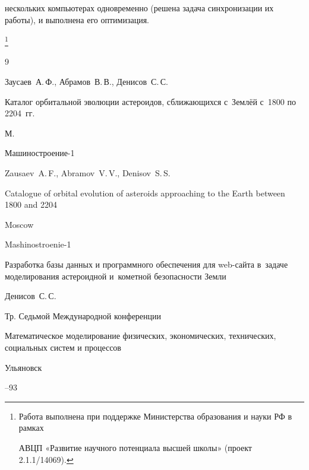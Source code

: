 нескольких компьютерах одновременно (решена задача синхронизации их работы), и выполнена его оптимизация. 





{\thanks{Работа выполнена при поддержке Министерства образования и науки РФ в рамках

АВЦП «Развитие научного потенциала высшей школы» (проект 2.1.1/14069).}}






\begin{thebibliography}{9}




\by Заусаев~А.\,Ф., Абрамов~В.\,В., Денисов~С.\,С. 

\book Каталог орбитальной эволюции астероидов, сближающихся с~Землёй с~1800 по 2204~гг. 

\publaddr М.

\publ Машиностроение-1 



\misctransl

\by Zausaev~A.\,F., Abramov~V.\,V., Denisov~S.\,S. 

\book Catalogue of orbital evolution of asteroids approaching to the Earth between 1800 and 2204

\publaddr Moscow

\publ Mashinostroenie-1






\paper Разработка базы данных и программного обеспечения для web-сайта в~задаче моделирования астероидной и~кометной безопасности Земли

\by Денисов~С.\,С.

\bookinfo Тр. Седьмой Международной конференции

\inbook Математическое моделирование физических, экономических, технических, социальных систем и процессов

\publaddr Ульяновск


--93

\misctransl


\end{thebibliography}
